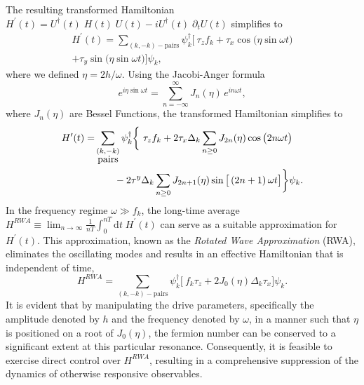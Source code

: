 \documentclass[%
reprint,
superscriptaddress,
amsmath,amssymb,
aps,
prb,
showkeys,
]{revtex4-2}
\begin{document}
The resulting transformed Hamiltonian $H^\prime(t) = U^\dagger(t)\;H(t)\;U(t)-iU^\dagger(t)\;\partial_tU(t)$ simplifies to
\begin{multline}
	\label{eq:rotated:tfim}
	H^\prime(t) = \sum_{(k,-k)-\mbox{pairs}} \psi^\dagger_k
	\bigg[\ \tau_z f_k + \tau_x \cos{\big(\eta\sin{\omega t}\big)}  \\
	+ \tau_y \sin{\big(\eta\sin{\omega t}\big)}\bigg]\psi_k,
\end{multline}
where we defined $\eta=2h/\omega$. Using the Jacobi-Anger formula~\cite{arfkenmath}
\begin{equation}
	\label{eq:jacobi}
	e^{i \eta \sin{\omega t}} = \displaystyle\sum_{n=-\infty}^{\infty} J_n(\eta)\, e^{i n \omega t},
\end{equation} 
where $J_n(\eta)$ are Bessel Functions, the transformed Hamiltonian simplifies to \\
\begin{align}
	H^\prime(t) =& \sum_{\substack{(k,-k) \\ \mbox{pairs}}} \psi^\dagger_k
	\bigg\{\ \tau_z f_k + 2\tau_x \Delta_k \sum_{n\geq 0} J_{2n}(\eta)\cos{\big(2n\omega t\big)} \nonumber\\
	&\hskip 0.7cm- 2\tau^y\Delta_k \sum_{n\geq 0} J_{2n+1}(\eta)\sin{\big[\left(2n+1\right)\omega t\big]}   \bigg\}\psi_k.
\end{align}
In the frequency regime  $\omega \gg f_k$, the long-time average $H^{RWA}\equiv\displaystyle\lim_{n\rightarrow\infty}\frac{1}{nT}\int^{nT}_0\mathrm{d}t\;H^\prime(t)$ can serve as a suitable approximation for $H^\prime(t)$. This approximation, known as the \emph{Rotated Wave Approximation} (RWA), eliminates the oscillating modes and results in an effective Hamiltonian that is independent of time,
\begin{equation}
	\label{eq:hrwa:tfim}
	H^{RWA} = \sum_{(k,-k)-\mbox{pairs}} \psi^\dagger_k
	\bigg[\ f_k\tau_z + 2 J_0(\eta) \Delta_k\tau_x \bigg]\psi_k.
\end{equation}
It is evident that by manipulating the drive parameters, specifically the amplitude denoted by $h$ and the frequency denoted by $\omega$, in a manner such that $\eta$ is positioned on a root of $J_0(\eta)$, the fermion number can be conserved to a significant extent at this particular resonance. Consequently, it is feasible to exercise direct control over $H^{RWA}$, resulting in a comprehensive suppression of the dynamics of otherwise responsive observables.
\end{document}
